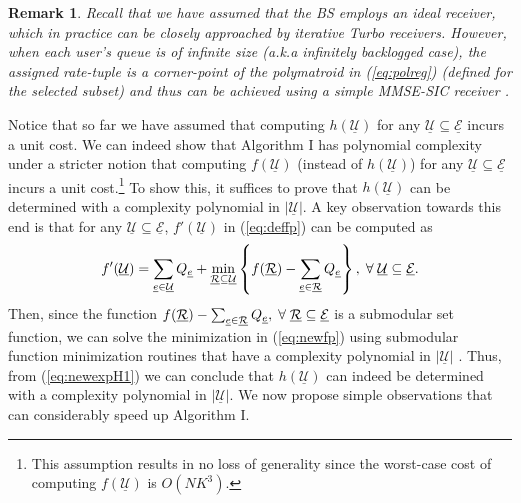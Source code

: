 \documentclass[11pt] {article}
\newcommand{\Uulc} {{\underline{\mathcal U}}}
\newcommand{\Eulc} {{\underline{\mathcal E}}}
\newcommand{\Rulc} {{\underline{\mathcal R}}}
\newtheorem{remark}{Remark}
\begin{document}
\begin{remark}
Recall that we have assumed that the BS employs an ideal receiver, which in practice can be closely approached by iterative Turbo receivers. However, when each user's queue is of infinite size (a.k.a infinitely backlogged case), the assigned rate-tuple   is a corner-point of the polymatroid in (\ref{eq:polreg}) (defined for the selected subset) and thus can be achieved using a simple MMSE-SIC receiver  \cite{VaranasiMK:ODF:Asil97}.
\end{remark}

 Notice that so far we have  assumed that computing $h(\Uulc)$ for any $\Uulc\subseteq\Eulc$ incurs a unit cost. We can indeed show that Algorithm I has polynomial complexity under a stricter notion that computing $f(\Uulc)$ (instead of $h(\Uulc)$) for any $\Uulc\subseteq\Eulc$ incurs a unit cost.\footnote{This assumption results in no loss of generality  since the worst-case cost of computing $f(\Uulc)$ is $O(NK^3)$.} To show this, it suffices to prove that $h(\Uulc)$ can be determined with a complexity
polynomial in $|\Uulc|$.  A key observation towards this end is that for any $\Uulc\subseteq\Eulc$, $f'(\Uulc)$ in (\ref{eq:deffp})  can be computed as
\begin{eqnarray}\label{eq:newfp}
  f'(\Uulc)=\sum_{\eul\in\Uulc}Q_{\eul}+\min_{\Rulc\subseteq\Uulc}\left\{f(\Rulc)-\sum_{\eul\in\Rulc}Q_{\eul}\right\},\;\forall\;\Uulc\subseteq\Eulc.
 \end{eqnarray}
Then, since the function $f(\Rulc)-\sum_{\eul\in\Rulc}Q_{\eul},\;\forall\;\Rulc\subseteq\Eulc$ is a submodular set function, we can  solve the minimization in (\ref{eq:newfp}) using submodular function minimization routines that have a complexity polynomial in $|\Uulc|$ \cite{iwata:submin}.
Thus, from (\ref{eq:newexpH1}) we can conclude that $h(\Uulc)$ can indeed be determined with a complexity
polynomial in $|\Uulc|$.
We now propose simple observations that can considerably speed up Algorithm I.
\end{document}
